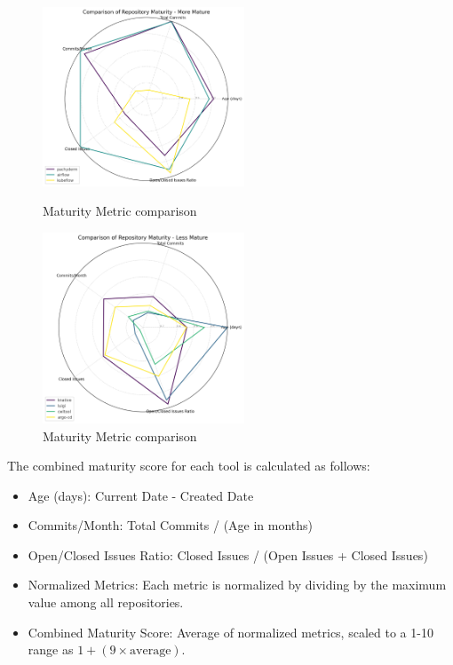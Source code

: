 \begin{figure}[H]
  \centering
  \begin{minipage}{.5\textwidth}
    \centering
    \includegraphics[width=6cm]{graphics/Maturity_graph_larger.png}
    \caption[Maturity Metric comparison (higher rated projects)]{Maturity Metric comparison}
    \label{abb: maturity_metric_comparison_larger}
  \end{minipage}%
  \begin{minipage}{.5\textwidth}
    \centering
    \includegraphics[width=6cm]{graphics/Maturity_graph_smaller.png}
    \caption[Maturity Metric comparison (lower rated projects)]{Maturity Metric comparison}
    \label{abb: maturity_metric_comparison_smaller}
  \end{minipage}
\end{figure}


The combined maturity score for each tool is calculated as follows:


\begin{itemize}
  \item Age (days): Current Date - Created Date
  \item Commits/Month: Total Commits / (Age in months)
  \item Open/Closed Issues Ratio: Closed Issues / (Open Issues + Closed Issues)
  \item Normalized Metrics: Each metric is normalized by dividing by the maximum value among all repositories.
  \item Combined Maturity Score: Average of normalized metrics, scaled to a 1-10 range as \( 1 + (9 \times \text{average}) \).
\end{itemize}

